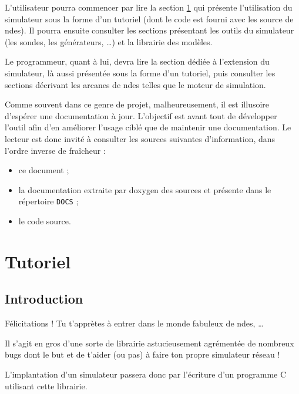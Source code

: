 \documentclass{article}
\begin{document}
   L'utilisateur pourra commencer par lire la section
\ref{section:user-tuto} qui présente l'utilisation du simulateur sous
la forme d'un tutoriel (dont le code est fourni avec les source de
{\sc ndes}). Il pourra ensuite consulter les sections présentant les
outils du simulateur (les sondes, les générateurs, \ldots) et la
librairie des modèles.

   Le programmeur, quant à lui, devra lire la section dédiée à
l'extension du simulateur, là aussi présentée sous la forme d'un
tutoriel, puis consulter les sections décrivant les arcanes de {\sc
  ndes} telles que le moteur de simulation.

   Comme souvent dans ce genre de projet, malheureusement, il est
illusoire d'espérer une documentation à jour. L'objectif est avant
tout de développer l'outil afin d'en améliorer l'usage ciblé que de
maintenir une documentation. Le lecteur est donc invité à consulter
les sources suivantes d'information, dans l'ordre inverse de fraîcheur
:

\begin{itemize}
   \item ce document ;
   \item la documentation extraite par doxygen des sources et présente
     dans le répertoire {\tt DOCS} ;
   \item le code source.
\end{itemize}

   
%
\section{Tutoriel}
\label{section:user-tuto}

\subsection{Introduction}

   Félicitations ! Tu t'apprètes à entrer dans le monde fabuleux de
{\sc ndes}, \ldots

   Il s'agit en gros d'une sorte de librairie astucieusement
agrémentée de nombreux bugs dont le but et de t'aider (ou pas) à faire
ton propre simulateur réseau !

   L'implantation d'un simulateur passera donc par l'écriture d'un
programme C utilisant cette librairie.
\end{document}
